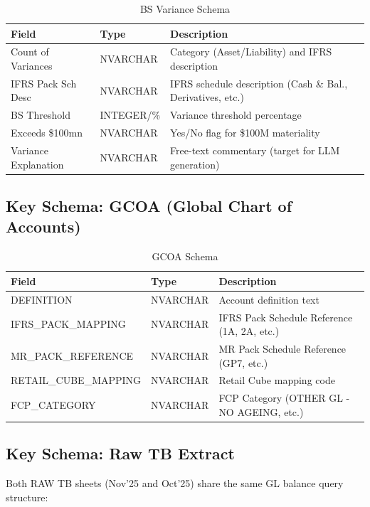 \documentclass[11pt,a4paper]{article}
\begin{document}
\begin{table}[H]
\centering
\caption{BS Variance Schema}
\begin{tabularx}{\textwidth}{llX}
\toprule
\textbf{Field} & \textbf{Type} & \textbf{Description} \\
\midrule
Count of Variances & NVARCHAR & Category (Asset/Liability) and IFRS description \\
IFRS Pack Sch Desc & NVARCHAR & IFRS schedule description (Cash \& Bal., Derivatives, etc.) \\
BS Threshold & INTEGER/\% & Variance threshold percentage \\
Exceeds \$100mn & NVARCHAR & Yes/No flag for \$100M materiality \\
Variance Explanation & NVARCHAR & Free-text commentary (target for LLM generation) \\
\bottomrule
\end{tabularx}
\end{table}

\subsection{Key Schema: GCOA (Global Chart of Accounts)}

\begin{table}[H]
\centering
\caption{GCOA Schema}
\begin{tabularx}{\textwidth}{llX}
\toprule
\textbf{Field} & \textbf{Type} & \textbf{Description} \\
\midrule
DEFINITION & NVARCHAR & Account definition text \\
IFRS\_PACK\_MAPPING & NVARCHAR & IFRS Pack Schedule Reference (1A, 2A, etc.) \\
MR\_PACK\_REFERENCE & NVARCHAR & MR Pack Schedule Reference (GP7, etc.) \\
RETAIL\_CUBE\_MAPPING & NVARCHAR & Retail Cube mapping code \\
FCP\_CATEGORY & NVARCHAR & FCP Category (OTHER GL - NO AGEING, etc.) \\
\bottomrule
\end{tabularx}
\end{table}

\subsection{Key Schema: Raw TB Extract}

Both RAW TB sheets (Nov'25 and Oct'25) share the same GL balance query structure:
\end{document}
